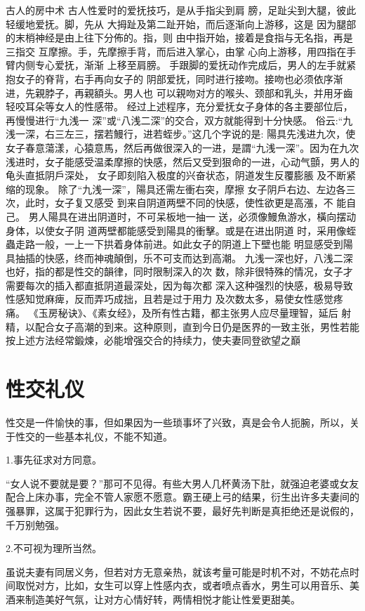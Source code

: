 \documentclass[12pt,UTF8]{ctexbook}
\begin{document}
古人的房中术
古人性爱时的爱抚技巧，是从手指尖到肩
膀，足趾尖到大腿，彼此轻缓地爱抚。脚，先从
大拇趾及第二趾开始，而后逐渐向上游移，这是
因为腿部的末梢神经是由上往下分佈的。指，则
由中指开始，接着是食指与无名指，再是三指交
互摩擦。手，先摩擦手背，而后进入掌心，由掌
心向上游移，用四指在手臂内侧专心爱抚，渐渐
上移至肩膀。
手跟脚的爱抚动作完成后，男人的左手就紧抱女子的脊背，右手再向女子的
阴部爱抚，同时进行接吻。接吻也必须依序渐进，先親脖子，再親額头。男人也
可以親吻对方的喉头、颈部和乳头，并用牙齒轻咬耳朵等女人的性感带。
经过上述程序，充分爱抚女子身体的各主要部位后，再慢慢进行“九浅一
深”或“八浅二深”的交合，双方就能得到十分快感。
俗云:“九浅一深，右三左三，摆若鰻行，进若蛭步。”这几个字说的是:
陽具先浅进九次，使女子春意蕩漾，心猿意馬，然后再做很深入的一进，是謂“九浅一深”。因为在九次浅进时，女子能感受温柔摩擦的快感，然后又受到狠命的一进，心动气顫，男人的龟头直抵阴戶深处，
女子即刻陷入极度的兴奋状态，阴道发生反覆膨脹
及不断紧缩的现象。
除了“九浅一深”，陽具还需左衝右突，摩擦
女子阴戶右边、左边各三次，此时，女子复又感受
到来自阴道两壁不同的快感，使性欲更是高漲，不
能自己。
男人陽具在进出阴道时，不可呆板地一抽一
送，必须像鰻魚游水，橫向摆动身体，以使女子阴
道两壁都能感受到陽具的衝擊。或是在进出阴道
时，采用像蛭蟲走路一般，一上一下拱着身体前进。如此女子的阴道上下壁也能
明显感受到陽具抽插的快感，终而神魂顛倒，乐不可支而达到高潮。
九浅一深也好，八浅二深也好，指的都是性交的韻律，同时限制深入的次
数，除非很特殊的情况，女子才需要每次的插入都直抵阴道最深处，因为每次都
深入这种强烈的快感，极易导致性感知觉麻痺，反而弄巧成拙，且若是过于用力
及次数太多，易使女性感觉疼痛。
《玉房秘诀》、《素女经》，及所有性古籍，都主张男人应尽量理智，延后
射精，以配合女子高潮的到来。这种原则，直到今日仍是医界的一致主张，男性若能按上述方法经常鍛煉，必能增强交合的持续力，使夫妻同登欲望之巔

\chapter{性交礼仪}

性交是一件愉快的事，但如果因为一些琐事坏了兴致，真是会令人扼腕，所以，关于性交的一些基本礼仪，不能不知道。

1.事先征求对方同意。

“女人说不要就是要？”那可不见得。有些大男人几杯黄汤下肚，就强迫老婆或女友配合上床办事，完全不管人家愿不愿意。霸王硬上弓的结果，衍生出许多夫妻间的强暴罪，这属于犯罪行为，因此女生若说不要，最好先判断是真拒绝还是说假的，千万别勉强。

2.不可视为理所当然。

虽说夫妻有同居义务，但若对方无意亲热，就该考量可能是时机不对，不妨花点时间取悦对方，比如，女生可以穿上性感内衣，或者喷点香水，男生可以用音乐、美酒来制造美好气氛，让对方心情好转，两情相悦才能让性爱更甜美。
\end{document}
